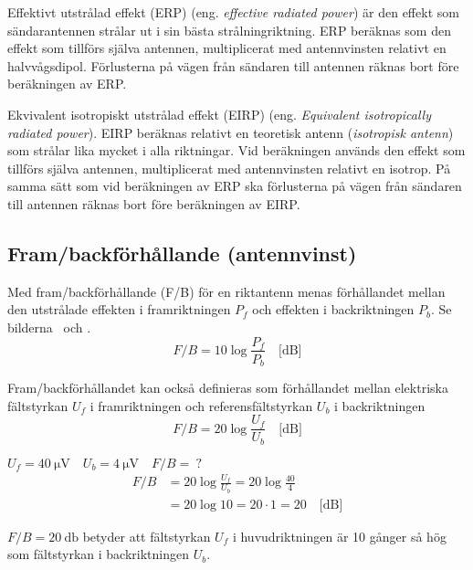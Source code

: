 Effektivt utstrålad effekt (ERP) (eng. \emph{effective radiated power}) är den
effekt som sändarantennen strålar ut i sin bästa strålningriktning.
ERP beräknas som den effekt som tillförs själva antennen, multiplicerat med
antennvinsten relativt en halvvågsdipol.
Förlusterna på vägen från sändaren till antennen räknas bort före beräkningen av
ERP.

Ekvivalent isotropiskt utstrålad effekt (EIRP)
(eng. \emph{Equivalent isotropically radiated power}).
EIRP beräknas relativt en teoretisk antenn (\emph{isotropisk antenn}) som
strålar lika mycket i alla riktningar.
Vid beräkningen används den effekt som tillförs själva antennen, multiplicerat
med antennvinsten relativt en isotrop.
På samma sätt som vid beräkningen av ERP ska förlusterna på vägen från sändaren
till antennen räknas bort före beräkningen av EIRP.

\subsection{Fram/backförhållande (antennvinst)}

Med fram/backförhållande (F/B) för en riktantenn menas förhållandet mellan den
utstrålade effekten i framriktningen \(P_f\) och effekten i backriktningen
\(P_b\). Se bilderna~ och .
\[ F/B = 10 \log\frac{P_f}{P_b} \quad \text{[dB]} \]

Fram/backförhållandet kan också definieras som förhållandet mellan elektriska
fältstyrkan \(U_f\) i framriktningen och referensfältstyrkan \(U_b\) i
backriktningen
\[ F/B = 20 \log\frac{U_f}{U_b} \quad \text{[dB]} \]

\begin{exempelbox}
\( U_f = \qty{40}{\micro\volt} \quad U_b = \qty{4}{\micro\volt} \quad F/B =\ ? \)
\tcblower
\begin{align*}
  F/B &= 20 \log\frac{U_f}{U_b} = 20 \log\frac{40}{4} \\
  &= 20 \log 10 = 20 \cdot 1 = 20 \quad \text{[dB]}
\end{align*}

\(F/B = \qty{20}{\decibel}\) betyder att fältstyrkan \(U_f\) i huvudriktningen är
10 gånger så hög som fältstyrkan i backriktningen \(U_b\).
\end{exempelbox}

